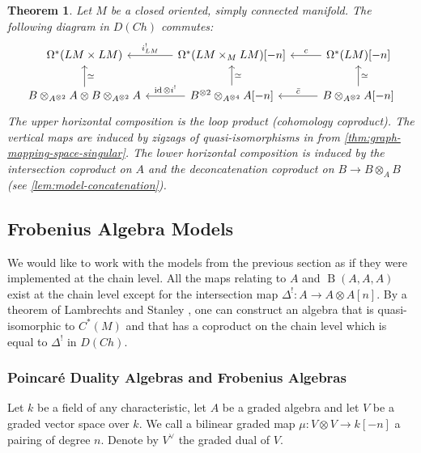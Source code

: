 \documentclass{scrartcl}
\theoremstyle{plain}
\newtheorem{theorem}{Theorem}[section]
\theoremstyle{definition}
\newcommand{\quiso}{\simeq}
\DeclareMathOperator{\id}{id}
\DeclareMathOperator{\BC}{B}
\begin{document}
\begin{theorem}\label{thm:loop-product-derived-dR}
    Let $M$ be a closed oriented, simply connected manifold. 
    The following diagram in $D(Ch)$ commutes:
    \begin{equation}\label{diag:loop-product-derived-dR}
    \begin{tikzcd}
        \Omega^*(LM\times LM) & \lar[swap, "i^!_{LM}"] \Omega^*(LM\times_M LM)[-n] & \lar[swap, "c"] \Omega^*(LM)[-n] \\
        B\otimes_{A^{\otimes 2}} A\otimes B\otimes_{A^{\otimes 2}} A \uar[swap, "\quiso"] & \lar[swap, "\id\otimes i^!"] B^{\otimes 2}\otimes_{A^{\otimes 4}} A[-n]\uar[swap, "\quiso"] & B\otimes_{A^{\otimes 2}} A[-n] \lar[swap, "\bar c"]\uar[swap, "\quiso"]
    \end{tikzcd}
    \end{equation}
    The upper horizontal composition is the loop product (cohomology coproduct). The vertical maps are induced by zigzags of quasi-isomorphisms in from \cref{thm:graph-mapping-space-singular}. The lower horizontal composition is induced by the intersection coproduct on $A$ and the deconcatenation coproduct on $B\to B\otimes_A B$ (see \cref{lem:model-concatenation}).
\end{theorem}


\subsection{Frobenius Algebra Models}\label{subsec:poincare-algebra}

We would like to work with the models from the previous section as if they were implemented at the chain level. All the maps relating to $A$ and $\BC(A, A, A)$ exist at the chain level except for the intersection map $\Delta^!\colon A\to A\otimes A[n]$. 
By a theorem of Lambrechts and Stanley \cite{lambrechts2008poincare}, one can construct an algebra that is quasi-isomorphic to $C^*(M)$ and that has a coproduct on the chain level which is equal to $\Delta^!$ in $D(Ch)$. 

\subsubsection{Poincaré Duality Algebras and Frobenius Algebras}

Let $k$ be a field of any characteristic, let $A$ be a graded algebra and let $V$ be a graded vector space over $k$. We call a bilinear graded map $\mu\colon V\otimes V\to k[-n]$ a pairing of degree $n$. Denote by $V^\vee$ the graded dual of $V$.
\end{document}
